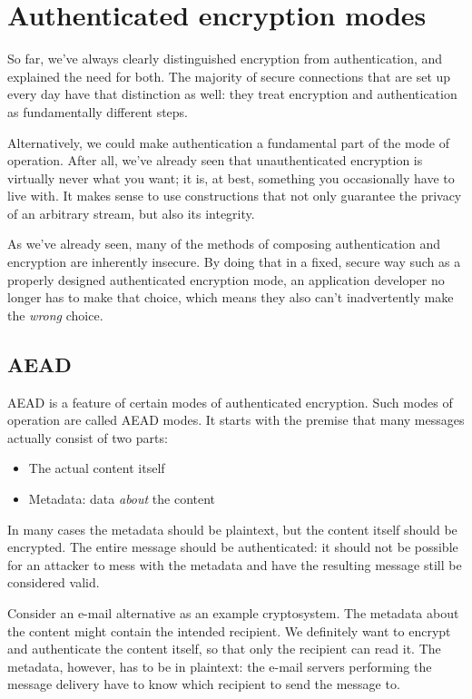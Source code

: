 \documentclass[11pt,ebook,table,dvipsnames]{memoir}
\begin{document}
\section{Authenticated encryption modes}
\label{sec-2-7-7}

So far, we've always clearly distinguished encryption from
authentication, and explained the need for both. The majority of
secure connections that are set up every day have that distinction as
well: they treat encryption and authentication as fundamentally
different steps.

Alternatively, we could make authentication a fundamental part of the
mode of operation. After all, we've already seen that unauthenticated
encryption is virtually never what you want; it is, at best, something
you occasionally have to live with. It makes sense to use
constructions that not only guarantee the privacy of an arbitrary
stream, but also its integrity.

As we've already seen, many of the methods of composing authentication
and encryption are inherently insecure. By doing that in a fixed,
secure way such as a properly designed authenticated encryption mode,
an application developer no longer has to make that choice, which
means they also can't inadvertently make the \emph{wrong} choice.

\subsection{\Gls{AEAD}}
\label{sec-2-7-7-1}

\Gls{AEAD} is a feature of certain modes of authenticated encryption.
Such modes of operation are called \glspl{AEAD mode}. It starts with
the premise that many messages actually consist of two parts:

\begin{itemize}
\item The actual content itself
\item Metadata: data \emph{about} the content
\end{itemize}

In many cases the metadata should be plaintext, but the content itself
should be encrypted. The entire message should be authenticated: it
should not be possible for an attacker to mess with the metadata and
have the resulting message still be considered valid.

Consider an e-mail alternative as an example cryptosystem. The
metadata about the content might contain the intended recipient. We
definitely want to encrypt and authenticate the content itself, so
that only the recipient can read it. The metadata, however, has to be
in plaintext: the e-mail servers performing the message delivery have
to know which recipient to send the message to.
\end{document}
